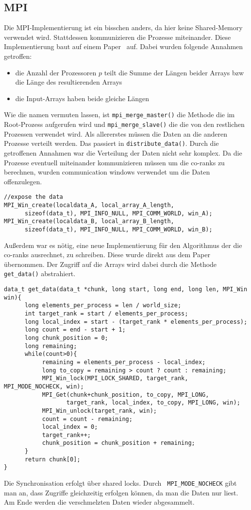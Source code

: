 \subsection{MPI}
Die MPI-Implementierung ist ein bisschen anders, da hier keine Shared-Memory verwendet wird. Stattdessen kommunizieren die Prozesse miteinander. Diese Implementierung baut auf einem Paper~\cite{mpi} auf. Dabei wurden folgende Annahmen getroffen:
\begin{itemize}
\item die Anzahl der Prozessoren $p$ teilt die Summe der Längen beider Arrays bzw die Länge des resultierenden Arrays
\item die Input-Arrays haben beide gleiche Längen
\end{itemize}
Wie die namen vermuten lassen, ist \verb|mpi_merge_master()| die Methode die im Root-Prozess aufgerufen wird und \verb|mpi_merge_slave()| die die von den restlichen Prozessen verwendet wird. Als allererstes müssen die Daten an die anderen Prozesse verteilt werden. Das passiert in \verb|distribute_data()|. Durch die getroffenen Annahmen war die Verteilung der Daten nicht sehr komplex. Da die Prozesse eventuell miteinander kommunizieren müssen um die co-ranks zu berechnen, wurden communication windows verwendet um die Daten offenzulegen.
\begin{verbatim}
//expose the data
MPI_Win_create(localdata_A, local_array_A_length, 
      sizeof(data_t), MPI_INFO_NULL, MPI_COMM_WORLD, win_A);
MPI_Win_create(localdata_B, local_array_B_length, 
      sizeof(data_t), MPI_INFO_NULL, MPI_COMM_WORLD, win_B);
\end{verbatim}
Außerdem war es nötig, eine neue Implementierung für den Algorithmus der die co-ranks ausrechnet, zu schreiben. Diese wurde direkt aus dem Paper übernommen. Der Zugriff auf die Arrays wird dabei durch die Methode \verb|get_data()| abstrahiert. 
\begin{verbatim}
data_t get_data(data_t *chunk, long start, long end, long len, MPI_Win win){
      long elements_per_process = len / world_size;
      int target_rank = start / elements_per_process;
      long local_index = start - (target_rank * elements_per_process);
      long count = end - start + 1;
      long chunk_position = 0;
      long remaining;
      while(count>0){
           remaining = elements_per_process - local_index;
           long to_copy = remaining > count ? count : remaining;
           MPI_Win_lock(MPI_LOCK_SHARED, target_rank, MPI_MODE_NOCHECK, win);
           MPI_Get(chunk+chunk_position, to_copy, MPI_LONG, 
                  target_rank, local_index, to_copy, MPI_LONG, win);
           MPI_Win_unlock(target_rank, win);
           count = count - remaining;
           local_index = 0;
           target_rank++;
           chunk_position = chunk_position + remaining;
      }
      return chunk[0];
}
\end{verbatim}
Die Synchronisation erfolgt über shared locks. Durch \verb| MPI_MODE_NOCHECK| gibt man an, dass Zugriffe gleichzeitig erfolgen können, da man die Daten nur liest. Am Ende werden die verschmelzten Daten wieder abgesammelt.